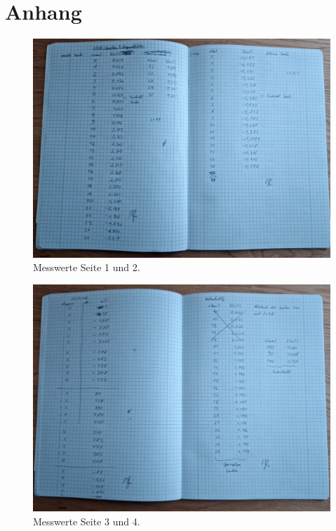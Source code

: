 \section{Anhang}
\label{sec:Anhang}

\begin{figure}
    \caption{Messwerte Seite 1 und 2.}
    \centering
    \includegraphics[width=\textwidth]{"Bilder/mw1.jpeg"}
\end{figure}

\begin{figure}
    \caption{Messwerte Seite 3 und 4.}
    \centering
    \includegraphics[width=\textwidth]{"Bilder/mw2.jpeg"}
\end{figure}


